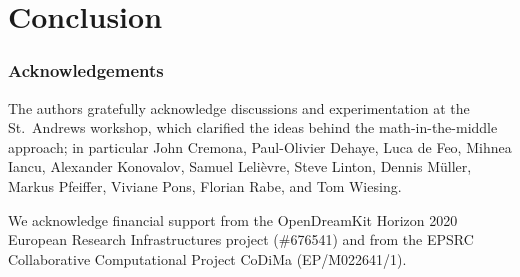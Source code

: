\section{Conclusion}
\subsubsection*{Acknowledgements}
The authors gratefully acknowledge discussions and experimentation at the St.\ Andrews
workshop, which clarified the ideas behind the math-in-the-middle approach;
in particular John Cremona, Paul-Olivier Dehaye, Luca de Feo, Mihnea Iancu, Alexander
Konovalov, Samuel Leli\`evre, Steve Linton, Dennis M\"uller, Markus Pfeiffer, Viviane Pons,
Florian Rabe, and Tom Wiesing.

We acknowledge financial support from the OpenDreamKit Horizon 2020 European Research
Infrastructures project (\#676541) and from the EPSRC Collaborative Computational Project
CoDiMa (EP/M022641/1).

